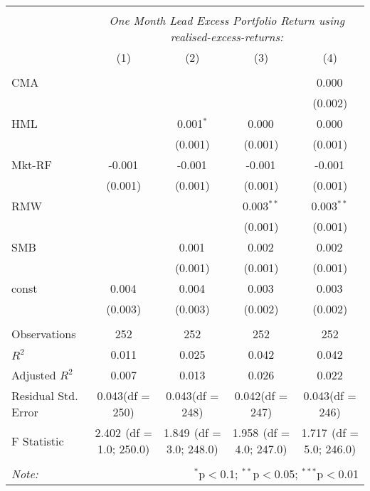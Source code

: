 \begin{table}[!htbp] \centering
\begin{tabular}{@{\extracolsep{5pt}}lcccc}
\\[-1.8ex]\hline
\hline \\[-1.8ex]
& \multicolumn{4}{c}{\textit{One Month Lead Excess Portfolio Return using realised-excess-returns:}} \
\cr \cline{4-5}
\\[-1.8ex] & (1) & (2) & (3) & (4) \\
\hline \\[-1.8ex]
 CMA & & & & 0.000$^{}$ \\
  & & & & (0.002) \\
 HML & & 0.001$^{*}$ & 0.000$^{}$ & 0.000$^{}$ \\
  & & (0.001) & (0.001) & (0.001) \\
 Mkt-RF & -0.001$^{}$ & -0.001$^{}$ & -0.001$^{}$ & -0.001$^{}$ \\
  & (0.001) & (0.001) & (0.001) & (0.001) \\
 RMW & & & 0.003$^{**}$ & 0.003$^{**}$ \\
  & & & (0.001) & (0.001) \\
 SMB & & 0.001$^{}$ & 0.002$^{}$ & 0.002$^{}$ \\
  & & (0.001) & (0.001) & (0.001) \\
 const & 0.004$^{}$ & 0.004$^{}$ & 0.003$^{}$ & 0.003$^{}$ \\
  & (0.003) & (0.003) & (0.002) & (0.002) \\
\hline \\[-1.8ex]
 Observations & 252 & 252 & 252 & 252 \\
 $R^2$ & 0.011 & 0.025 & 0.042 & 0.042 \\
 Adjusted $R^2$ & 0.007 & 0.013 & 0.026 & 0.022 \\
 Residual Std. Error & 0.043(df = 250) & 0.043(df = 248) & 0.042(df = 247) & 0.043(df = 246)  \\
 F Statistic & 2.402$^{}$ (df = 1.0; 250.0) & 1.849$^{}$ (df = 3.0; 248.0) & 1.958$^{}$ (df = 4.0; 247.0) & 1.717$^{}$ (df = 5.0; 246.0) \\
\hline
\hline \\[-1.8ex]
\textit{Note:} & \multicolumn{4}{r}{$^{*}$p$<$0.1; $^{**}$p$<$0.05; $^{***}$p$<$0.01} \\
\end{tabular}
\end{table}
